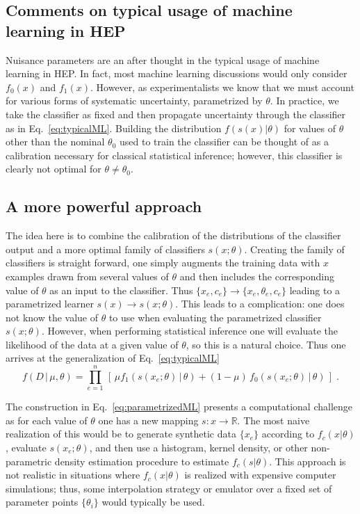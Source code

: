\documentclass[11pt, oneside]{article}   	%
\begin{document}
\subsection{Comments on typical usage of machine learning in HEP}

Nuisance parameters are an after thought in the typical usage of machine learning in HEP. In fact, most machine learning discussions would only consider $f_0(x)$ and $f_1(x)$. However, as experimentalists we know that we must account for various forms of systematic uncertainty, parametrized by $\theta$. In practice, we take the classifier as fixed and then propagate uncertainty through the classifier as in Eq.~\ref{eq:typicalML}. Building the distribution $f(s(x)|\theta)$ for values of $\theta$ other than the nominal $\theta_0$ used to train the classifier can be thought of as a calibration necessary for classical statistical inference; however, this classifier is clearly not optimal for $\theta \ne \theta_0$.

\subsection{A more powerful  approach}

The idea here is to combine the calibration of the distributions of the classifier output and a more optimal family of classifiers $s(x; \theta)$. Creating the family of classifiers is straight forward, one simply augments the training data with $x$ examples drawn from several values of $\theta$ and then includes the corresponding value of $\theta$ as an input to the classifier. Thus $\{x_e,c_e\} \to \{x_e,\theta_e, c_e\}$ leading to a parametrized learner $s(x)\to s(x;\theta)$. This leads to a complication: one does not know the value of $\theta$ to use when evaluating the parametrized classifier $s(x;\theta)$.  However, when performing statistical inference one will evaluate the likelihood of the data at a given value of $\theta$, so this is a natural choice.  Thus one arrives at the generalization of Eq.~\ref{eq:typicalML}
\begin{equation}\label{eq:parametrizedML}
f( D \,|\, \mu, \theta) = \prod_{e=1}^n \, \left[\, \mu f_1( s(x_e;\theta) \, |\,  \theta)  + (1-\mu)\, f_0( s(x_e;\theta) \,|\, \theta) \,\right] \; .
\end{equation}

The construction in Eq.~\ref{eq:parametrizedML} presents a computational challenge as for each value of $\theta$ one has a new mapping $s: x\to\mathbb{R}$. The most naive realization of this would be to generate synthetic data $\{x_e\}$ according to $f_c(x|\theta)$, evaluate $s(x_e ; \theta)$, and then use a histogram, kernel density, or other non-parametric density estimation procedure to estimate $f_c( s | \theta)$. This approach is not realistic in situations where $f_c(x|\theta)$ is realized with expensive computer simulations; thus, some interpolation strategy or emulator over a fixed set of parameter points $\{\theta_i\}$ would typically be used.
\end{document}
